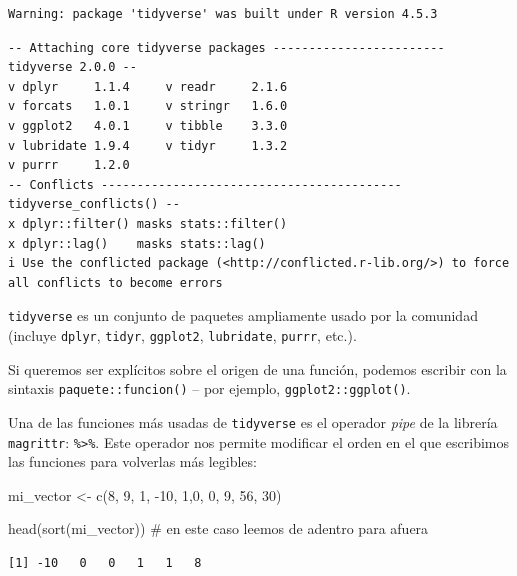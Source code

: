 \documentclass[
  letterpaper,
  DIV=11,
  numbers=noendperiod]{scrartcl}
\newenvironment{Shaded}{\begin{snugshade}}{\end{snugshade}}
\newcommand{\CommentTok}[1]{\textcolor[rgb]{0.37,0.37,0.37}{#1}}
\newcommand{\DecValTok}[1]{\textcolor[rgb]{0.68,0.00,0.00}{#1}}
\newcommand{\FunctionTok}[1]{\textcolor[rgb]{0.28,0.35,0.67}{#1}}
\newcommand{\NormalTok}[1]{\textcolor[rgb]{0.00,0.23,0.31}{#1}}
\newcommand{\OtherTok}[1]{\textcolor[rgb]{0.00,0.23,0.31}{#1}}
\newcommand{\SpecialCharTok}[1]{\textcolor[rgb]{0.37,0.37,0.37}{#1}}
\begin{document}
\begin{verbatim}
Warning: package 'tidyverse' was built under R version 4.5.3
\end{verbatim}

\begin{verbatim}
-- Attaching core tidyverse packages ------------------------ tidyverse 2.0.0 --
v dplyr     1.1.4     v readr     2.1.6
v forcats   1.0.1     v stringr   1.6.0
v ggplot2   4.0.1     v tibble    3.3.0
v lubridate 1.9.4     v tidyr     1.3.2
v purrr     1.2.0     
-- Conflicts ------------------------------------------ tidyverse_conflicts() --
x dplyr::filter() masks stats::filter()
x dplyr::lag()    masks stats::lag()
i Use the conflicted package (<http://conflicted.r-lib.org/>) to force all conflicts to become errors
\end{verbatim}

\texttt{tidyverse} es un conjunto de paquetes ampliamente usado por la
comunidad (incluye \texttt{dplyr}, \texttt{tidyr}, \texttt{ggplot2},
\texttt{lubridate}, \texttt{purrr}, etc.).

Si queremos ser explícitos sobre el origen de una función, podemos
escribir con la sintaxis \texttt{paquete::funcion()} -- por ejemplo,
\texttt{ggplot2::ggplot()}.

Una de las funciones más usadas de \texttt{tidyverse} es el operador
\emph{pipe} de la librería \texttt{magrittr}:
\texttt{\%\textgreater{}\%}. Este operador nos permite modificar el
orden en el que escribimos las funciones para volverlas más legibles:

\begin{Shaded}
\begin{Highlighting}[]
\NormalTok{mi\_vector }\OtherTok{\textless{}{-}} \FunctionTok{c}\NormalTok{(}\DecValTok{8}\NormalTok{, }\DecValTok{9}\NormalTok{, }\DecValTok{1}\NormalTok{, }\SpecialCharTok{{-}}\DecValTok{10}\NormalTok{, }\DecValTok{1}\NormalTok{,}\DecValTok{0}\NormalTok{, }\DecValTok{0}\NormalTok{, }\DecValTok{9}\NormalTok{, }\DecValTok{56}\NormalTok{, }\DecValTok{30}\NormalTok{)}

\FunctionTok{head}\NormalTok{(}\FunctionTok{sort}\NormalTok{(mi\_vector)) }\CommentTok{\# en este caso leemos de adentro para afuera}
\end{Highlighting}
\end{Shaded}

\begin{verbatim}
[1] -10   0   0   1   1   8
\end{verbatim}
\end{document}
